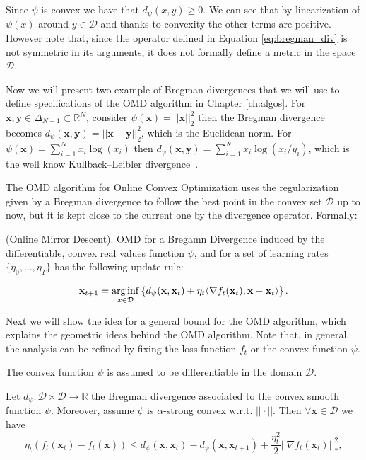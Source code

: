 Since $\psi$ is convex we have that $d_\psi(x,y)\ge0$. We can see that by linearization of $\psi(x)$ around $y\in\mathcal D$ and thanks to convexity the other terms are positive. However note that, since the operator defined in Equation \eqref{eq:bregman_div} is not symmetric in its arguments, it does not formally define a metric in the space $\mathcal D$.

Now we will present two example of Bregman divergences that we will use to define specifications of the OMD algorithm in Chapter \ref{ch:algos}.
For $\mathbf x,\mathbf y\in\Delta_{N-1}\subset \mathbb R^N$, consider $\psi(\mathbf x)=||\mathbf x||_2^2$ then the Bregman divergence becomes $d_\psi(\mathbf x,\mathbf y)=||\mathbf x-\mathbf y||_2^2$, which is the Euclidean norm. For $\psi(\mathbf x)=\sum\limits_{i=1}^Nx_i\log(x_i)$ then $d_\psi(\mathbf x,\mathbf y)=\sum\limits_{i=1}^Nx_i\log(x_i/y_i)$, which is the well know Kullback–Leibler divergence~\cite{van2014renyi}.

The OMD algorithm for Online Convex Optimization uses the regularization given by a Bregman divergence to follow the best point in the convex set $\mathcal D$ up to now, but it is kept close to the current one by the divergence operator. Formally:

\begin{definition}(Online Mirror Descent). OMD for a Bregamn Divergence induced by the differentiable, convex real values function $\psi$, and for a set of learning rates $\{\eta_0,\ldots,\eta_T\}$ has the following update rule: 

\begin{equation}\label{eq:OMD_update}
\mathbf x_{t+1} =\operatorname*{arg\,inf}\limits_{x\in\mathcal D} \left\{d_\psi(\mathbf x,\mathbf x_t)+\eta_t\langle\nabla f_t(\mathbf x_t),\mathbf x-\mathbf x_t\rangle\right\}.
\end{equation}
\end{definition}

Next we will show the idea for a general bound for the OMD algorithm, which explains the geometric ideas behind the OMD algorithm. Note that, in general, the analysis can be refined by fixing the loss function $f_t$ or the convex function $\psi$. 

The convex function $\psi$ is assumed to be differentiable in the domain $\mathcal D$.

\begin{lemma}\label{th:OMD_first_th}
Let $d_\psi:\mathcal D\times\mathcal D\to \mathbb R$ the Bregman divergence associated to the convex smooth function $\psi$. Moreover, assume $\psi$ is $\alpha$-strong convex w.r.t. $||\cdot||$.
Then $\forall \mathbf x\in\mathcal D$ we have 
$$\eta_t (f_t(\mathbf x_t)-f_t(\mathbf x))\le d_\psi(\mathbf x,\mathbf x_t)-d_\psi(\mathbf x,\mathbf x_{t+1})+\frac{\eta_t^2}{2}||\nabla f_t(\mathbf x_t)||_*^2,$$ 
\end{lemma}

